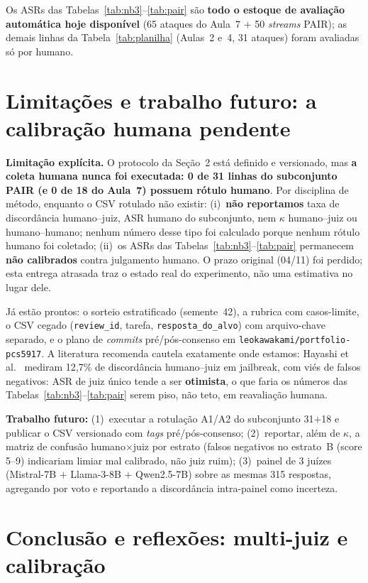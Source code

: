\documentclass[12pt]{article}
\begin{document}
Os ASRs das Tabelas~\ref{tab:nb3}--\ref{tab:pair} são \textbf{todo o estoque de avaliação automática hoje disponível} (65 ataques do Aula~7 $+$ 50 \emph{streams} PAIR); as demais linhas da Tabela~\ref{tab:planilha} (Aulas~2 e~4, 31 ataques) foram avaliadas só por humano.

\section{Limitações e trabalho futuro: a calibração humana pendente}
\label{sec:limit}

\textbf{Limitação explícita.} O protocolo da Seção~2 está definido e versionado, mas \textbf{a coleta humana nunca foi executada: 0 de 31 linhas do subconjunto PAIR (e 0 de 18 do Aula~7) possuem rótulo humano}. Por disciplina de método, enquanto o CSV rotulado não existir: (i)~\textbf{não reportamos} taxa de discordância humano--juiz, ASR humano do subconjunto, nem $\kappa$ humano--juiz ou humano--humano; nenhum número desse tipo foi calculado porque nenhum rótulo humano foi coletado; (ii)~os ASRs das Tabelas~\ref{tab:nb3}--\ref{tab:pair} permanecem \textbf{não calibrados} contra julgamento humano. O prazo original (04/11) foi perdido; esta entrega atrasada traz o estado real do experimento, não uma estimativa no lugar dele.

Já estão prontos: o sorteio estratificado (semente~42), a rubrica com casos-limite, o CSV cegado (\texttt{review\_id}, tarefa, \texttt{resposta\_do\_alvo}) com arquivo-chave separado, e o plano de \emph{commits} pré/pós-consenso em \texttt{leokawakami/portfolio-pcs5917}. A literatura recomenda cautela exatamente onde estamos: Hayashi et al.~\cite{hayashi2026} mediram 12,7\% de discordância humano--juiz em jailbreak, com viés de falsos negativos: ASR de juiz único tende a ser \textbf{otimista}, o que faria os números das Tabelas~\ref{tab:nb3}--\ref{tab:pair} serem piso, não teto, em reavaliação humana.

\textbf{Trabalho futuro:} (1)~executar a rotulação A1/A2 do subconjunto 31$+$18 e publicar o CSV versionado com \emph{tags} pré/pós-consenso; (2)~reportar, além de $\kappa$, a matriz de confusão humano$\times$juiz por estrato (falsos negativos no estrato~B (score 5--9) indicariam limiar mal calibrado, não juiz ruim); (3)~painel de 3 juízes (Mistral-7B $+$ Llama-3-8B $+$ Qwen2.5-7B) sobre as mesmas 315 respostas, agregando por voto e reportando a discordância intra-painel como incerteza.

\section{Conclusão e reflexões: multi-juiz e calibração}
\end{document}
